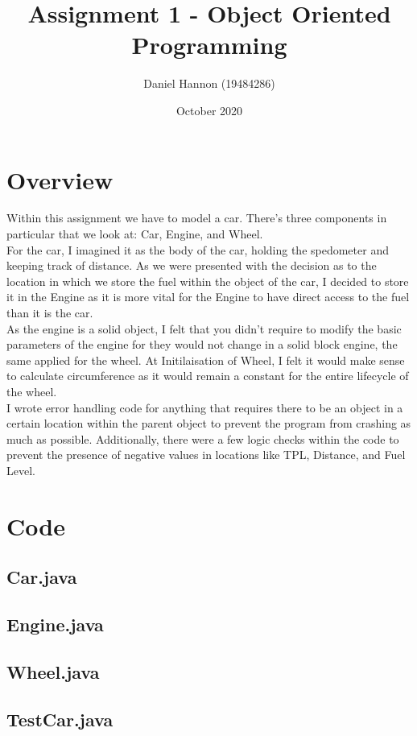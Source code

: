 \documentclass{article}
\title{Assignment 1 - Object Oriented Programming}
\author{Daniel Hannon (19484286)}
\date{October 2020}
\begin{document}
	\maketitle
	\section{Overview}
	Within this assignment we have to model a car. There's three components in particular that we look at: Car, Engine, and Wheel.\\
	For the car, I imagined it as the body of the car, holding the spedometer and keeping track of distance. As we were presented with the decision as to the location in which we store the fuel within the object of the car, I decided to store it in the Engine as it is more vital for the Engine to have direct access to the fuel than it is the car. \\ As the engine is a solid object, I felt that you didn't require to modify the basic parameters of the engine for they would not change in a solid block engine, the same applied for the wheel. At Initilaisation of Wheel, I felt it would make sense to calculate circumference as it would remain a constant for the entire lifecycle of the wheel. \\ I wrote error handling code for anything that requires there to be an object in a certain location within the parent object to prevent the program from crashing as much as possible. Additionally, there were a few logic checks within the code to prevent the presence of negative values in locations like TPL, Distance, and Fuel Level.
	\section{Code}
	\subsection{Car.java}
	\newpage
	\subsection{Engine.java}
	\subsection{Wheel.java}
	\subsection{TestCar.java}
\end{document}
